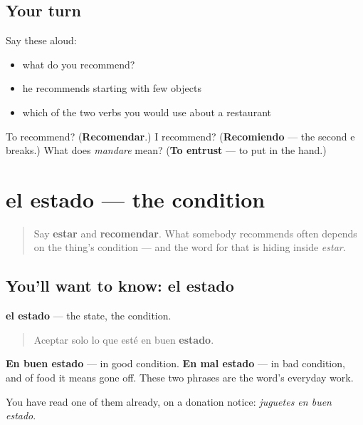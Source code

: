 \subsection*{Your turn}
Say these aloud:

\begin{itemize}
\raggedright
  \item what do you recommend?
  \item he recommends starting with few objects
  \item which of the two verbs you would use about a restaurant
\end{itemize}

\begin{tcolorbox}[breakable,colback=teal!4,colframe=teal!35!black,title={Before you move on}]
To recommend? (\textbf{Recomendar}.) I recommend? (\textbf{Recomiendo} — the second e breaks.) What does \emph{mandare} mean? (\textbf{To entrust} — to put in the hand.)
\end{tcolorbox}
\section[el estado]{el estado — the condition}

\label{lesson:ES-C473-estado}



\begin{quote}
Say \textbf{estar} and \textbf{recomendar}. What somebody recommends often depends on the thing's condition — and the word for that is hiding inside \emph{estar}.
\end{quote}

\subsection*{You'll want to know: el estado}
\textbf{el estado} — the state, the condition.

\begin{quote}
Aceptar solo lo que esté en buen \textbf{estado}.
\end{quote}

\textbf{En buen estado} — in good condition. \textbf{En mal estado} — in bad condition, and of food it means gone off. These two phrases are the word's everyday work.

You have read one of them already, on a donation notice: \emph{juguetes en buen estado}.

